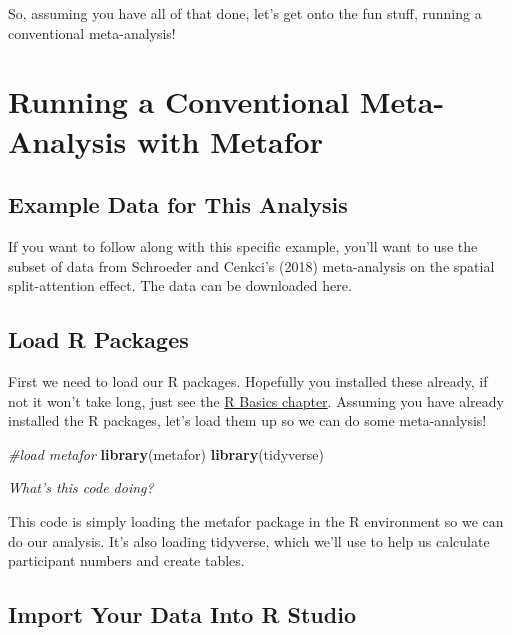 \documentclass[
]{book}
\newenvironment{Shaded}{\begin{snugshade}}{\end{snugshade}}
\newcommand{\CommentTok}[1]{\textcolor[rgb]{0.56,0.35,0.01}{\textit{#1}}}
\newcommand{\FunctionTok}[1]{\textcolor[rgb]{0.13,0.29,0.53}{\textbf{#1}}}
\newcommand{\NormalTok}[1]{#1}
\begin{document}
So, assuming you have all of that done, let's get onto the fun stuff, running a conventional meta-analysis!

\hypertarget{running-a-conventional-meta-analysis-with-metafor}{%
\section{Running a Conventional Meta-Analysis with Metafor}\label{running-a-conventional-meta-analysis-with-metafor}}

\hypertarget{example-data-for-this-analysis}{%
\subsection{Example Data for This Analysis}\label{example-data-for-this-analysis}}

If you want to follow along with this specific example, you'll want to use the subset of data from Schroeder and Cenkci's (2018)\citep{schroeder2018} meta-analysis on the spatial split-attention effect. The data can be downloaded here.

\hypertarget{load-r-packages}{%
\subsection{Load R Packages}\label{load-r-packages}}

First we need to load our R packages. Hopefully you installed these already, if not it won't take long, just see the \protect\hyperlink{crossrpackages}{R Basics chapter}. Assuming you have already installed the R packages, let's load them up so we can do some meta-analysis!

\begin{Shaded}
\begin{Highlighting}[]
\CommentTok{\#load metafor}
\FunctionTok{library}\NormalTok{(metafor)}
\FunctionTok{library}\NormalTok{(tidyverse)}
\end{Highlighting}
\end{Shaded}

\emph{What's this code doing?}

This code is simply loading the metafor package in the R environment so we can do our analysis. It's also loading tidyverse, which we'll use to help us calculate participant numbers and create tables.

\hypertarget{import-your-data-into-r-studio}{%
\subsection{Import Your Data Into R Studio}\label{import-your-data-into-r-studio}}
\end{document}

